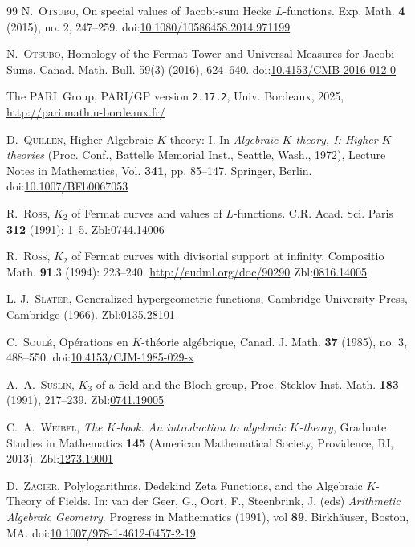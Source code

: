 \documentclass[11pt,a4,leqno]{amsart}
\theoremstyle{my theoremstyle}
\theoremstyle{dfn}
\theoremstyle{remark}
\renewcommand{\1}{\mathbbm{1}}
\numberwithin{equation}{section}
\begin{document}
\begin{thebibliography}{99}
\textsc{N.~Otsubo},
On special values of Jacobi-sum Hecke $L$-functions.
Exp. Math. \textbf{4} (2015), no. 2, 247--259.
doi:\href{https://doi.org/10.1080/10586458.2014.971199}{10.1080/10586458.2014.971199}

\textsc{N.~Otsubo},
Homology of the Fermat Tower and Universal Measures for Jacobi Sums. Canad. Math. Bull. 59(3) (2016), 624--640. doi:\href{https://doi.org/10.4153/CMB-2016-012-0}{10.4153/CMB-2016-012-0}

The PARI~Group, PARI/GP version \texttt{2.17.2}, Univ. Bordeaux, 2025,
\url{http://pari.math.u-bordeaux.fr/}

\textsc{D.~Quillen},
Higher Algebraic $K$-theory: I. In \emph{Algebraic $K$-theory, I: Higher $K$-theories} (Proc. Conf., Battelle Memorial Inst., Seattle, Wash., 1972), Lecture Notes in Mathematics, Vol. \textbf{341}, pp. 85–147. Springer, Berlin. doi:\href{https://doi.org/10.1007/BFb0067053}{10.1007/BFb0067053}

\textsc{R.~Ross},
$K_2$ of Fermat curves and values of $L$-functions. C.R. Acad. Sci. Paris \textbf{312} (1991): 1--5. 
Zbl:\href{https://zbmath.org/0744.14006}{0744.14006}

\textsc{R.~Ross},
$K_2$ of Fermat curves with divisorial support at infinity. Compositio Math. \textbf{91}.3 (1994): 223--240. \href{http://eudml.org/doc/90290}{http://eudml.org/doc/90290} Zbl:\href{https://zbmath.org/0816.14005}{0816.14005} 

\textsc{L. J.~Slater}, 
Generalized hypergeometric functions, 
Cambridge University Press, Cambridge (1966).
Zbl:\href{https://zbmath.org/0135.28101}{0135.28101} 

\textsc{C.~Soul\'e},
Op\'erations en $K$-th\'eorie alg\'ebrique, Canad. J. Math. \textbf{37} (1985), no. 3, 488–550. doi:\href{https://doi.org/10.4153/CJM-1985-029-x}{10.4153/CJM-1985-029-x}

\textsc{A.~A.~Suslin},
$K_3$ of a field and the Bloch group,
Proc. Steklov Inst. Math. \textbf{183} (1991), 217--239.
Zbl:\href{https://zbmath.org/0741.19005}{0741.19005}

\textsc{C.~A.~Weibel},
\emph{The $K$-book. An introduction to algebraic $K$-theory}, Graduate Studies in Mathematics
\textbf{145} (American Mathematical Society, Providence, RI, 2013).
Zbl:\href{https://zbmath.org/1273.19001}{1273.19001}

\textsc{D.~Zagier},
Polylogarithms, Dedekind Zeta Functions, and the Algebraic $K$-Theory of Fields.
In: van der Geer, G., Oort, F., Steenbrink, J. (eds) \emph{Arithmetic Algebraic Geometry}. Progress in Mathematics (1991), vol \textbf{89}. Birkhäuser, Boston, MA.
doi:\href{https://doi.org/10.1007/978-1-4612-0457-2_19}{10.1007/978-1-4612-0457-2-19}

\end{thebibliography}
\end{document}
